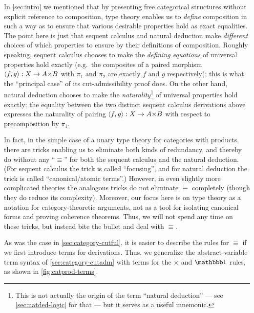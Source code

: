 \begin{rmk}
  In \cref{sec:intro} we mentioned that by presenting free categorical structures without explicit reference to composition, type theory enables us to \emph{define} composition in such a way as to ensure that various desirable properties hold as exact equalities.
  The point here is just that sequent calculus and natural deduction make \emph{different} choices of which properties to ensure by their definitions of composition.
  Roughly speaking, sequent calculus chooses to make the \emph{defining equations} of universal properties hold exactly (e.g.\ the composites of a paired morphism $\pair f g : X \to A\times B$ with $\pi_1$ and $\pi_2$ are exactly $f$ and $g$ respectively); this is what the ``principal case'' of its cut-admissibility proof does.
  On the other hand, natural deduction chooses to make the \emph{naturality}\footnote{This is not actually the origin of the term ``natural deduction'' --- see \cref{sec:natded-logic} for that --- but it serves as a useful mnemonic.} of universal properties hold exactly; the equality between the two distinct sequent calculus derivations above expresses the naturality of pairing $\pair f g : X \to A\times B$ with respect to precomposition by $\pi_1$.
\end{rmk}

In fact, in the simple case of a unary type theory for categories with products, there are tricks enabling us to eliminate {both} kinds of redundancy, and thereby do without any ``$\equiv$'' for both the sequent calculus and the natural deduction.
(For sequent calculus the trick is called ``focusing'', and for natural deduction the trick is called ``canonical/atomic terms''.)
However, in even slightly more complicated theories the analogous tricks do not eliminate $\equiv$ completely (though they do reduce its complexity).
Moreover, our focus here is on type theory as a notation for category-theoretic arguments, not as a tool for isolating canonical forms and proving coherence theorems.
Thus, we will not spend any time on these tricks, but instead bite the bullet and deal with $\equiv$.

As was the case in \cref{sec:category-cutful}, it is easier to describe the rules for $\equiv$ if we first introduce terms for derivations.
Thus, we generalize the abstract-variable term syntax of \cref{sec:category-cutadm} with terms for the $\times$ and $\unit$ rules, as shown in \cref{fig:catprod-terms}.

